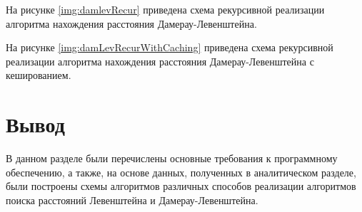 
\clearpage

На рисунке \ref{img:damlevRecur} приведена схема рекурсивной реализации алгоритма нахождения расстояния Дамерау-Левенштейна.


\clearpage

На рисунке \ref{img:damLevRecurWithCaching} приведена схема рекурсивной реализации алгоритма нахождения расстояния Дамерау-Левенштейна с кешированием.


\clearpage

\section*{Вывод}

В данном разделе были перечислены основные требования к программному обеспечению, а также, на основе  данных, полученных в аналитическом разделе, были построены схемы алгоритмов различных способов реализации алгоритмов поиска расстояний Левенштейна и Дамерау-Левенштейна.

